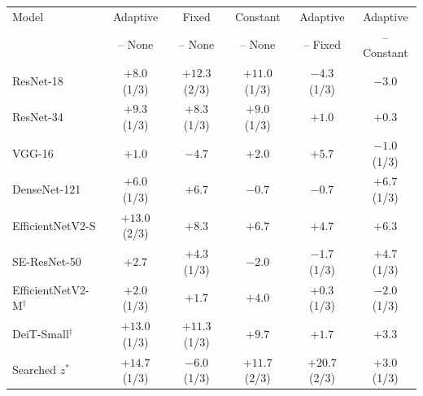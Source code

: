 \begin{tabular}{@{}lccccc@{}}
\toprule
Model & Adaptive & Fixed & Constant & Adaptive & Adaptive \\
 & -- None & -- None & -- None & -- Fixed & -- Constant \\
\midrule
ResNet-18 & $+8.0$ (1/3) & $+12.3$ (2/3) & $+11.0$ (1/3) & $-4.3$ (1/3) & $-3.0$ \\
ResNet-34 & $+9.3$ (1/3) & $+8.3$ (1/3) & $+9.0$ (1/3) & $+1.0$ & $+0.3$ \\
VGG-16 & $+1.0$ & $-4.7$ & $+2.0$ & $+5.7$ & $-1.0$ (1/3) \\
DenseNet-121 & $+6.0$ (1/3) & $+6.7$ & $-0.7$ & $-0.7$ & $+6.7$ (1/3) \\
EfficientNetV2-S & $+13.0$ (2/3) & $+8.3$ & $+6.7$ & $+4.7$ & $+6.3$ \\
SE-ResNet-50 & $+2.7$ & $+4.3$ (1/3) & $-2.0$ & $-1.7$ (1/3) & $+4.7$ (1/3) \\
EfficientNetV2-M$^{\dagger}$ & $+2.0$ (1/3) & $+1.7$ & $+4.0$ & $+0.3$ (1/3) & $-2.0$ (1/3) \\
DeiT-Small$^{\dagger}$ & $+13.0$ (1/3) & $+11.3$ (1/3) & $+9.7$ & $+1.7$ & $+3.3$ \\
\midrule
Searched $z^{*}$ & $+14.7$ (1/3) & $-6.0$ (1/3) & $+11.7$ (2/3) & $+20.7$ (2/3) & $+3.0$ (1/3) \\
\bottomrule
\end{tabular}
